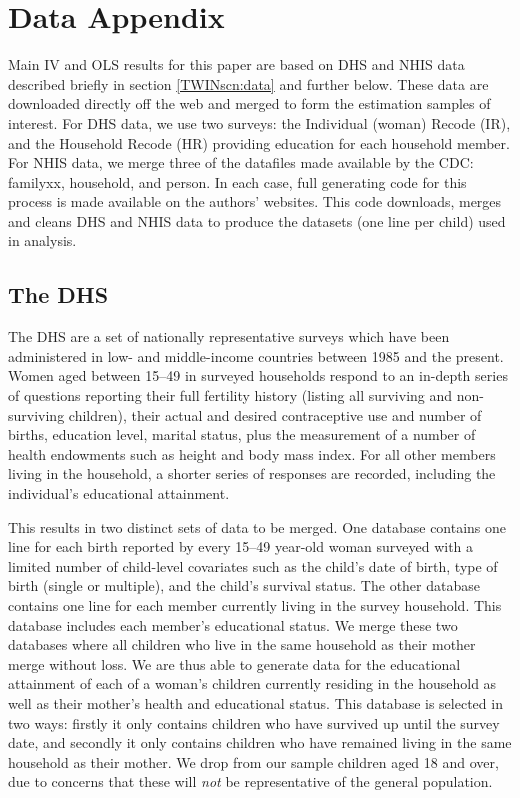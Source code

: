 \documentclass[a4paper, 11pt]{article}
\theoremstyle{plain}
\begin{document}
\newpage
\section{Data Appendix}
\label{TWINscn:dataApp}
Main IV and OLS results for this paper are based on DHS and NHIS data described
briefly in section \ref{TWINscn:data} and further below.  These data are 
downloaded directly off the web and merged to form the estimation samples of 
interest. For DHS data, we use two surveys: the Individual (woman) Recode (IR), 
and the Household Recode (HR) providing education for each household member.  
For NHIS data, we merge three of the datafiles made available by the CDC: familyxx, 
household, and person. In each case, full generating code for this process is 
made available on the authors' websites.  This code downloads, merges and cleans 
DHS and NHIS data to produce the datasets (one line per child) used in analysis.

\subsection{The DHS}
The DHS are a set of nationally representative surveys which have been 
administered in low- and middle-income countries between 1985 and the present. 
Women aged between 15--49 in surveyed households respond to an in-depth series 
of questions reporting their full fertility history (listing all surviving and 
non-surviving children), their actual and desired contraceptive use and number 
of births, education level, marital status, plus the measurement of a number of 
health endowments such as height and body mass index. For all other members 
living in the household, a shorter series of responses are recorded, including 
the individual's educational attainment.

This results in two distinct sets of data to be merged. One database contains 
one line for each birth reported by every 15--49 year-old woman surveyed with a 
limited number of child-level covariates such as the child's date of birth, type 
of birth (single or multiple), and the child's survival status. The other 
database contains one line for each member currently living in the survey
household. This database includes each member's educational status. We merge
these two databases where all children who live in the same household as their 
mother merge without loss.  We are thus able to generate data for the educational 
attainment of each of a woman's children currently residing in the household as 
well as their mother's health and educational status. This database is selected in 
two ways: firstly it only contains children who have survived up until the survey 
date, and secondly it only contains children who have remained living in the same 
household as their mother. We drop from our sample children aged 18 and over, due
to concerns that these will \emph{not} be representative of the general 
population.
\end{document}
